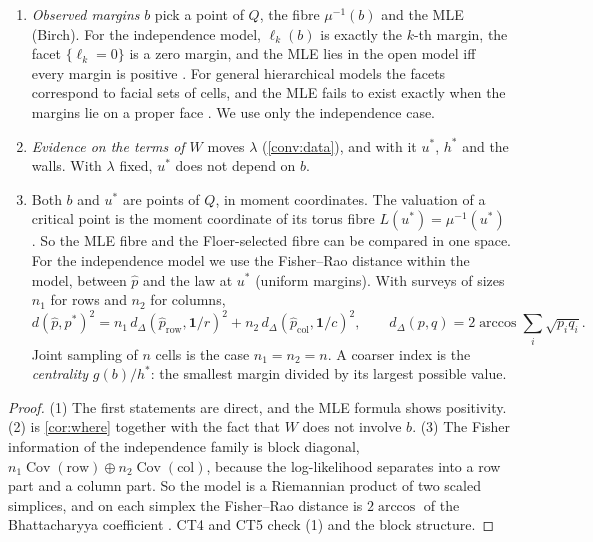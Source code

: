\documentclass[11pt]{article}
\theoremstyle{definition}\newtheorem{definition}[theorem]{Definition}\newtheorem{remark}[theorem]{Remark}\newtheorem{example}[theorem]{Example}\newtheorem{problem}[theorem]{Open problem}\crefname{problem}{Problem}{Problems}
\begin{document}
\begin{proposition}\label{prop:roles}
\begin{enumerate}
\item[(1)] \emph{Observed margins} $b$ pick a point of $Q$, the fibre $\mu^{-1}(b)$ and the MLE (Birch). For the independence model, $\ell_k(b)$ is exactly the $k$-th margin, the facet
  $\{\ell_k=0\}$ is a zero margin, and the MLE lies in the open model iff every margin is positive \cite{BishopFienbergHolland1975}. For general hierarchical models the
  facets correspond to facial sets of cells, and the MLE fails to exist exactly when the margins lie on a proper face \cite{EFRS2006,FienbergRinaldo2012}. We use only the independence case.
\item[(2)] \emph{Evidence on the terms of $W$} moves $\lambda$ (\cref{conv:data}), and with it $u^*$, $h^*$ and the walls. With $\lambda$ fixed, $u^*$ does not depend on $b$.
\item[(3)] Both $b$ and $u^*$ are points of $Q$, in moment coordinates. The valuation of a critical point is the moment coordinate of its torus fibre $L(u^*)=\mu^{-1}(u^*)$
  \cite{ChoOh2006}. So the MLE fibre and the Floer-selected fibre can be compared in one space. For the independence model we use the Fisher--Rao distance within
  the model, between $\hat p$ and the law at $u^*$ (uniform margins). With surveys of sizes $n_1$ for rows and $n_2$ for columns,
  \[
  d(\hat p,p^*)^2=n_1\,d_\Delta(\hat p_{\mathrm{row}},\mathbf 1/r)^2+n_2\,d_\Delta(\hat p_{\mathrm{col}},\mathbf 1/c)^2,\qquad d_\Delta(p,q)=2\arccos\sum_i\sqrt{p_iq_i}.
  \]
  Joint sampling of $n$ cells is the case $n_1=n_2=n$. A coarser index is the \emph{centrality} $g(b)/h^*$: the smallest margin divided by its largest possible value.
\end{enumerate}
\end{proposition}

\begin{proof}
(1) The first statements are direct, and the MLE formula shows positivity. (2) is \cref{cor:where} together with the fact that $W$ does not involve $b$. (3) The Fisher
information of the independence family is block diagonal, $n_1\operatorname{Cov}(\mathrm{row})\oplus n_2\operatorname{Cov}(\mathrm{col})$, because the log-likelihood separates into a row part and a column
part. So the model is a Riemannian product of two scaled simplices, and on each simplex the Fisher--Rao distance is $2\arccos$ of the Bhattacharyya coefficient \cite{AmariNagaoka2000}.
CT4 and CT5 check (1) and the block structure.
\end{proof}
\end{document}
